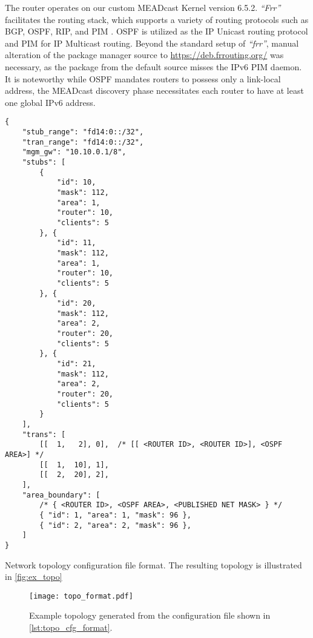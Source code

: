 The router operates on our custom MEADcast Kernel version 6.5.2.
\textit{``Frr''} facilitates the routing stack, which supports a variety of
    routing protocols such as BGP, OSPF, RIP, and PIM \cite{frr_doc}.
OSPF is utilized as the IP Unicast routing protocol and PIM for IP Multicast
    routing.
Beyond the standard setup of \textit{``frr''}, manual alteration of the package
    manager source to \url{https://deb.frrouting.org/} was necessary, as the
    package from the default source misses the IPv6 PIM daemon.
It is noteworthy while OSPF mandates routers to possess only a link-local
    address, the MEADcast discovery phase necessitates each router to have at
    least one global IPv6 address.

\begin{listing}
\begin{verbatim}
{
    "stub_range": "fd14:0::/32",
    "tran_range": "fd14:0::/32",
    "mgm_gw": "10.10.0.1/8",
    "stubs": [
        {
            "id": 10,
            "mask": 112,
            "area": 1,
            "router": 10,
            "clients": 5
        }, {
            "id": 11,
            "mask": 112,
            "area": 1,
            "router": 10,
            "clients": 5
        }, {
            "id": 20,
            "mask": 112,
            "area": 2,
            "router": 20,
            "clients": 5
        }, {
            "id": 21,
            "mask": 112,
            "area": 2,
            "router": 20,
            "clients": 5
        }
    ],
    "trans": [
        [[  1,   2], 0],  /* [[ <ROUTER ID>, <ROUTER ID>], <OSPF AREA>] */
        [[  1,  10], 1],
        [[  2,  20], 2],
    ],
    "area_boundary": [
        /* { <ROUTER ID>, <OSPF AREA>, <PUBLISHED NET MASK> } */
        { "id": 1, "area": 1, "mask": 96 },
        { "id": 2, "area": 2, "mask": 96 },
    ]
}
\end{verbatim}
    \caption[Network topology configuration file format]{
        Network topology configuration file format.
        The resulting topology is illustrated in \autoref{fig:ex_topo}
    }
    \label{lst:topo_cfg_format}
\end{listing}

\begin{figure}
    \begin{center}
        \texttt{[image: topo\_format.pdf]}
    \end{center}
    \caption[Example topology]{
        Example topology generated from the configuration file shown in
        \autoref{lst:topo_cfg_format}.
    }
    \label{fig:ex_topo}
\end{figure}

